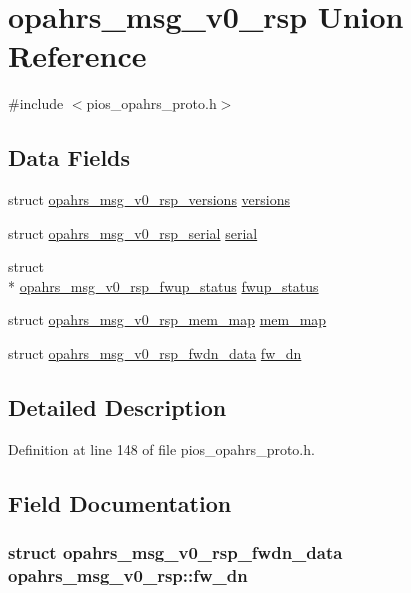 \hypertarget{unionopahrs__msg__v0__rsp}{\section{opahrs\-\_\-msg\-\_\-v0\-\_\-rsp Union Reference}
\label{unionopahrs__msg__v0__rsp}
}


{\ttfamily \#include $<$pios\-\_\-opahrs\-\_\-proto.\-h$>$}

\subsection*{Data Fields}
\begin{DoxyCompactItemize}
\item 
struct \hyperlink{structopahrs__msg__v0__rsp__versions}{opahrs\-\_\-msg\-\_\-v0\-\_\-rsp\-\_\-versions} \hyperlink{unionopahrs__msg__v0__rsp_a8da6adc95543c720f2aba2c4796b5c18}{versions}
\item 
struct \hyperlink{structopahrs__msg__v0__rsp__serial}{opahrs\-\_\-msg\-\_\-v0\-\_\-rsp\-\_\-serial} \hyperlink{unionopahrs__msg__v0__rsp_af9c00033181eeac6262ceaee211eb98c}{serial}
\item 
struct \\*
\hyperlink{structopahrs__msg__v0__rsp__fwup__status}{opahrs\-\_\-msg\-\_\-v0\-\_\-rsp\-\_\-fwup\-\_\-status} \hyperlink{unionopahrs__msg__v0__rsp_aadc40205b8e74ec656cacab84ce68647}{fwup\-\_\-status}
\item 
struct \hyperlink{structopahrs__msg__v0__rsp__mem__map}{opahrs\-\_\-msg\-\_\-v0\-\_\-rsp\-\_\-mem\-\_\-map} \hyperlink{unionopahrs__msg__v0__rsp_a4fb22fb94f9d21be3764c9e947139f99}{mem\-\_\-map}
\item 
struct \hyperlink{structopahrs__msg__v0__rsp__fwdn__data}{opahrs\-\_\-msg\-\_\-v0\-\_\-rsp\-\_\-fwdn\-\_\-data} \hyperlink{unionopahrs__msg__v0__rsp_a79fd43f31ceb459fa2b772ec68633526}{fw\-\_\-dn}
\end{DoxyCompactItemize}


\subsection{Detailed Description}


Definition at line 148 of file pios\-\_\-opahrs\-\_\-proto.\-h.



\subsection{Field Documentation}
\hypertarget{unionopahrs__msg__v0__rsp_a79fd43f31ceb459fa2b772ec68633526}{
\subsubsection[{fw\-\_\-dn}]{\setlength{\rightskip}{0pt plus 5cm}struct {\bf opahrs\-\_\-msg\-\_\-v0\-\_\-rsp\-\_\-fwdn\-\_\-data} opahrs\-\_\-msg\-\_\-v0\-\_\-rsp\-::fw\-\_\-dn}}\label{unionopahrs__msg__v0__rsp_a79fd43f31ceb459fa2b772ec68633526}


